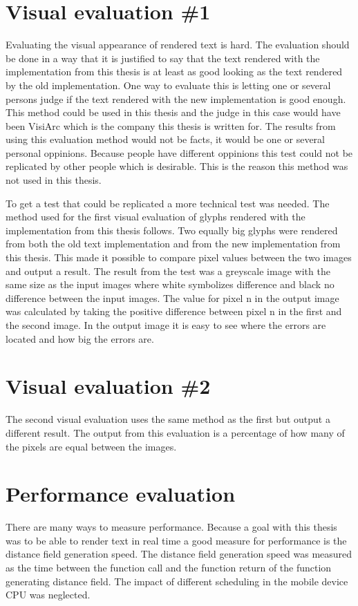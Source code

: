\section{Visual evaluation \#1}
Evaluating the visual appearance of rendered text is hard. The evaluation should be done in a way that it is justified to say that the text rendered with the implementation from this thesis is at least as good looking as the text rendered by the old implementation. One way to evaluate this is letting one or several persons judge if the text rendered with the new implementation is good enough. This method could be used in this thesis and the judge in this case would have been VisiArc which is the company this thesis is written for. The results from using this evaluation method would not be facts, it would be one or several personal oppinions. Because people have different oppinions this test could not be replicated by other people which is desirable. This is the reason this method was not used in this thesis.

To get a test that could be replicated a more technical test was needed. The method used for the first visual evaluation of glyphs rendered with the implementation from this thesis follows. Two equally big glyphs were rendered from both the old text implementation and from the new implementation from this thesis. This made it possible to compare pixel values between the two images and output a result. The result from the test was a greyscale image with the same size as the input images where white symbolizes difference and black no difference between the input images. The value for pixel n in the output image was calculated by taking the positive difference between pixel n in the first and the second image. In the output image it is easy to see where the errors are located and how big the errors are.
\section{Visual evaluation \#2} 
The second visual evaluation uses the same method as the first but output a different result. The output from this evaluation is a percentage of how many of the pixels are equal between the images. 
\section{Performance evaluation}
There are many ways to measure performance. Because a goal with this thesis was to be able to render text in real time a good measure for performance is the distance field generation speed. The distance field generation speed was measured as the time between the function call and the function return of the function generating distance field. The impact of different scheduling in the mobile device CPU was neglected.
